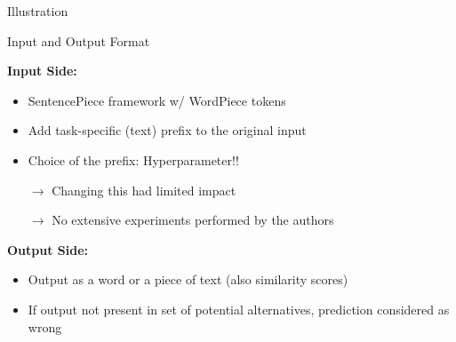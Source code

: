 
\begin{frame}{Illustration}

\vfill
\begin{figure}
    \centering
\end{figure}
\vfill

\end{frame}


\begin{frame}{Input and Output Format}

\vfill

	\textbf{Input Side:}

	\begin{itemize}
		\item SentencePiece framework w/ WordPiece tokens
		\item Add task-specific (text) prefix to the original input
		\item Choice of the prefix: Hyperparameter!! 
		\item[$\to$] Changing this had limited impact
		\item[$\to$] No extensive experiments performed by the authors
	\end{itemize}
	
	\vspace{.5cm}

	\textbf{Output Side:}

	\begin{itemize}
		\item Output as a word or a piece of text (also similarity scores)
		\item If output not present in set of potential alternatives, prediction considered as wrong
	\end{itemize}
	
\vfill

\end{frame}


